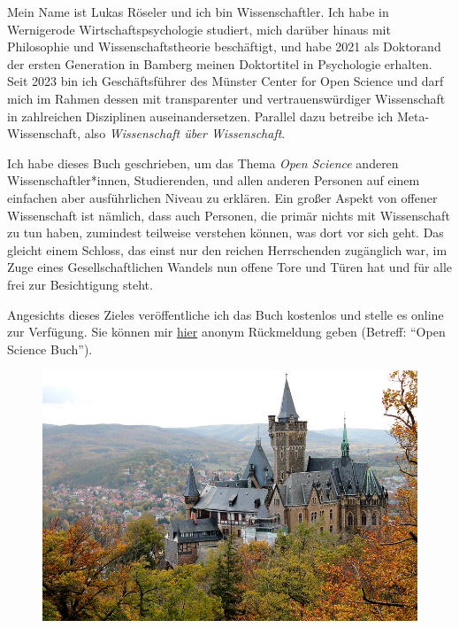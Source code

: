 \documentclass[
  letterpaper,
  DIV=11,
  numbers=noendperiod]{scrreprt}
\begin{document}
\begin{tcolorbox}[enhanced jigsaw, title=\textcolor{quarto-callout-note-color}{\faInfo}\hspace{0.5em}{Über mich}, colbacktitle=quarto-callout-note-color!10!white, rightrule=.15mm, titlerule=0mm, left=2mm, bottomrule=.15mm, arc=.35mm, leftrule=.75mm, toprule=.15mm, opacityback=0, breakable, bottomtitle=1mm, colframe=quarto-callout-note-color-frame, toptitle=1mm, opacitybacktitle=0.6, coltitle=black, colback=white]

Mein Name ist Lukas Röseler und ich bin Wissenschaftler. Ich habe in
Wernigerode Wirtschaftspsychologie studiert, mich darüber hinaus mit
Philosophie und Wissenschaftstheorie beschäftigt, und habe 2021 als
Doktorand der ersten Generation\footnotemark{} in Bamberg meinen
Doktortitel in Psychologie erhalten. Seit 2023 bin ich Geschäftsführer
des Münster Center for Open Science und darf mich im Rahmen dessen mit
transparenter und vertrauenswürdiger Wissenschaft in zahlreichen
Disziplinen auseinandersetzen. Parallel dazu betreibe ich
Meta-Wissenschaft, also \emph{Wissenschaft über Wissenschaft}.

Ich habe dieses Buch geschrieben, um das Thema \emph{Open Science}
anderen Wissenschaftler*innen, Studierenden, und allen anderen Personen
auf einem einfachen aber ausführlichen Niveau zu erklären. Ein großer
Aspekt von offener Wissenschaft ist nämlich, dass auch Personen, die
primär nichts mit Wissenschaft zu tun haben, zumindest teilweise
verstehen können, was dort vor sich geht. Das gleicht einem Schloss, das
einst nur den reichen Herrschenden zugänglich war, im Zuge eines
Gesellschaftlichen Wandels nun offene Tore und Türen hat und für alle
frei zur Besichtigung steht.

Angesichts dieses Zieles veröffentliche ich das Buch kostenlos und
stelle es online zur Verfügung. Sie können mir
\href{https://docs.google.com/forms/d/1Ce4uyr8bRSHZ5yywP3TPdIg8XMLxZqE-mYVL82K6QHI}{hier}
anonym Rückmeldung geben (Betreff: ``Open Science Buch'').

\begin{figure}[H]

{\centering \includegraphics[width=6.25in,height=\textheight]{images/wernigerode.jpg}

}
\end{figure}
\end{tcolorbox}
\end{document}
